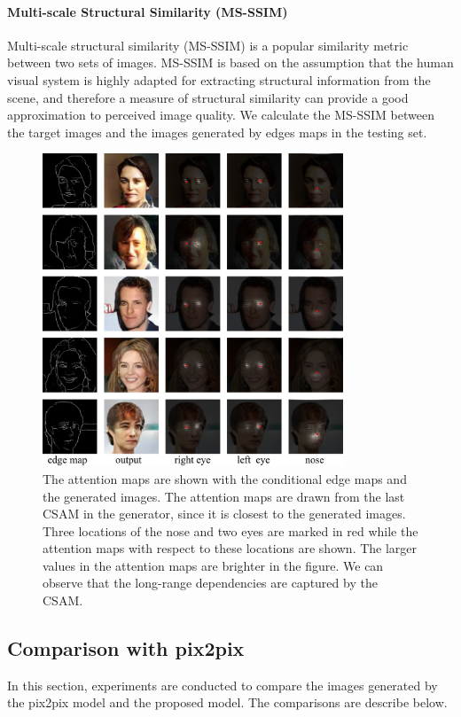 \paragraph{Multi-scale Structural Similarity (MS-SSIM)} Multi-scale structural similarity (MS-SSIM) is a popular similarity metric between two sets of images. MS-SSIM is based on the assumption that the human visual system is highly adapted for extracting structural information from the scene, and therefore a measure of structural similarity can provide a good approximation to perceived image quality. We calculate the MS-SSIM between the target images and the images generated by edges maps in the testing set.
%
%
\begin{figure}
	\includegraphics[width=0.8\textwidth]{figures/attention}
	\caption{The attention maps are shown with the conditional edge maps and the generated images. The attention maps are drawn from the last CSAM in the generator, since it is closest to the generated images. Three locations of the nose and two eyes are marked in red while the attention maps with respect to these locations are shown. The larger values in the attention maps are brighter in the figure. We can observe that the long-range dependencies are captured by the CSAM.}
	\label{fig:attention}
\end{figure}
%
%
\subsection{Comparison with pix2pix}
%
In this section, experiments are conducted to compare the images generated by the pix2pix model and the proposed model. The comparisons are describe below.
